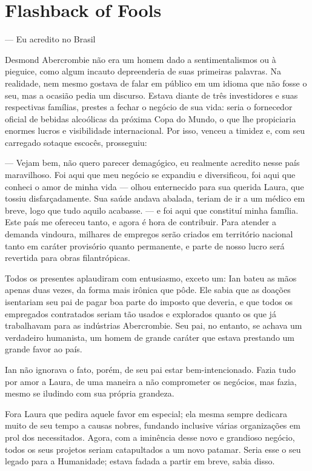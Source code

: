 \chapter{Flashback of Fools}


--- Eu acredito no Brasil

Desmond Abercrombie não era um homem dado a sentimentalismos ou à pieguice,
como algum incauto depreenderia de suas primeiras palavras. Na realidade, nem
mesmo gostava de falar em público em um idioma que não fosse o seu, mas a
ocasião pedia um discurso. Estava diante de três investidores e suas
respectivas famílias, prestes a fechar o negócio de sua vida: seria o
fornecedor oficial de bebidas alcoólicas da próxima Copa do Mundo, o que lhe
propiciaria enormes lucros e visibilidade internacional. Por isso, venceu a
timidez e, com seu carregado sotaque escocês, prosseguiu:

--- Vejam bem, não quero parecer demagógico, eu realmente acredito nesse país
maravilhoso. Foi aqui que meu negócio se expandiu e diversificou, foi aqui que
conheci o amor de minha vida --- olhou enternecido para sua querida Laura, que
tossiu disfarçadamente. Sua saúde andava abalada, teriam de ir a um médico em
breve, logo que tudo aquilo acabasse. --- e foi aqui que constituí minha
família. Este país me ofereceu tanto, e agora é hora de contribuir. Para
atender a demanda vindoura, milhares de empregos serão criados em território
nacional tanto em caráter provisório quanto permanente, e parte de nosso lucro
será revertida para obras filantrópicas.

Todos os presentes aplaudiram com entusiasmo, exceto um: Ian bateu as mãos
apenas duas vezes, da forma mais irônica que pôde. Ele sabia que as doações
isentariam seu pai de pagar boa parte do imposto que deveria, e que todos os
empregados contratados seriam tão usados e explorados quanto os que já
trabalhavam para as indústrias Abercrombie. Seu pai, no entanto, se achava um
verdadeiro humanista, um homem de grande caráter que estava prestando um grande
favor ao país.

Ian não ignorava o fato, porém, de seu pai estar bem-intencionado. Fazia tudo
por amor a Laura, de uma maneira a não comprometer os negócios, mas fazia,
mesmo se iludindo com sua própria grandeza.

Fora Laura que pedira aquele favor em especial; ela mesma sempre dedicara muito
de seu tempo a causas nobres, fundando inclusive várias organizações em prol
dos necessitados. Agora, com a iminência desse novo e grandioso negócio, todos
os seus projetos seriam catapultados a um novo patamar. Seria esse o seu legado
para a Humanidade; estava fadada a partir em breve, sabia disso.

